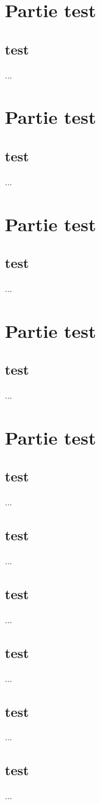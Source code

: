 \documentclass[answers,a4paper,twoside]{School-Work-Template}
\begin{document}
\chapter{Partie test}
\section{test}
...
\chapter{Partie test}
\section{test}
...
\chapter{Partie test}
\section{test}
...
\chapter{Partie test}
\section{test}
...
\chapter{Partie test}
\section{test}
...
\section{test}
...
\section{test}
...
\section{test}
...
\section{test}
...
\section{test}
...
\end{document}
